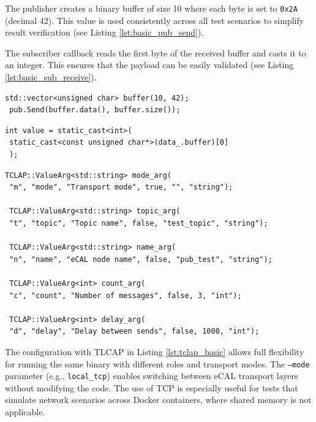 \vspace{1em}
The publisher creates a binary buffer of size 10 where each byte is set to \texttt{0x2A} (decimal 42). This value is used consistently across all test scenarios to simplify result verification (see Listing \ref{lst:basic_pub_send}).

\vspace{1em}
The subscriber callback reads the first byte of the received buffer and casts it to an integer. This ensures that the payload can be easily validated (see Listing \ref{lst:basic_sub_receive}).
\vspace{0.5em}

\begin{lstlisting}[style=cppstyle, caption={Binary buffer with value 42 used by the publisher}, label={lst:basic_pub_send}, captionpos=b]
 std::vector<unsigned char> buffer(10, 42);
 pub.Send(buffer.data(), buffer.size());
\end{lstlisting}

\begin{lstlisting}[style=cppstyle, caption={Extracting first byte from the received message in subscriber}, label={lst:basic_sub_receive}, captionpos=b]
 int value = static_cast<int>(
 static_cast<const unsigned char*>(data_.buffer)[0]
 );
\end{lstlisting}

\begin{lstlisting}[style=cppstyle, caption={Argument setup using TCLAP in both publisher and subscriber}, label={lst:tclap_basic}, captionpos=b]
 TCLAP::ValueArg<std::string> mode_arg(
 "m", "mode", "Transport mode", true, "", "string");
 
 TCLAP::ValueArg<std::string> topic_arg(
 "t", "topic", "Topic name", false, "test_topic", "string");
 
 TCLAP::ValueArg<std::string> name_arg(
 "n", "name", "eCAL node name", false, "pub_test", "string");
 
 TCLAP::ValueArg<int> count_arg(
 "c", "count", "Number of messages", false, 3, "int");
 
 TCLAP::ValueArg<int> delay_arg(
 "d", "delay", "Delay between sends", false, 1000, "int");
\end{lstlisting}

\vspace{0.4em}
The configuration with TLCAP in Listing \ref{lst:tclap_basic} allows full flexibility for running the same binary with different roles and transport modes. The \texttt{--mode} parameter (e.g., \texttt{local\_tcp}) enables switching between eCAL transport layers without modifying the code. The use of TCP is especially useful for tests that simulate network scenarios across Docker containers, where shared memory is not applicable.

